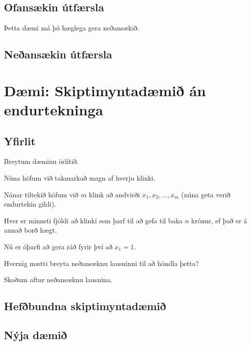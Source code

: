 \subsection{Ofansækin útfærsla}
{
}

{
    {
        \item<1-> Þetta dæmi má þó hæglega gera neðansækið.
    }
}

\subsection{Neðansækin útfærsla}
{
}

\section{Dæmi: Skiptimyntadæmið án endurtekninga}
\subsection{Yfirlit}
{
    {
        \item<1-> Breytum dæminu örlítið.
        \item<2-> Núna höfum við takmarkað magn af hverju klinki.
        \item<3-> Nánar tiltekið höfum við $m$ klink að andvirði $x_1, x_2, ..., x_m$ (núna geta verið endurtekin gildi).
        \item<4-> Hver er minnsti fjöldi að klinki sem þarf til að gefa til baka $n$ krónur, ef það er á annað borð hægt.
        \item<5-> Nú er óþarfi að gera ráð fyrir því að $x_1 = 1$.
        \item<6-> Hvernig mætti breyta neðansæknu lausninni til að höndla þetta?
        \item<7-> Skoðum aftur neðansæknu lausnina.
    }
}

\subsection{Hefðbundna skiptimyntadæmið}
{
}

\subsection{Nýja dæmið}
{
}

